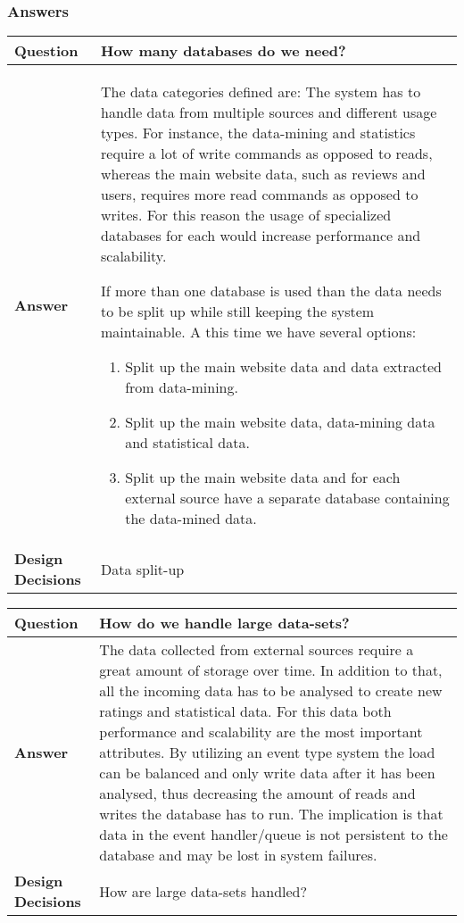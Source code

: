 \subsubsection{Answers}
\begin{longtable}{| l |  p{12cm} |}
\hline
\textbf{Question} & \textbf{How many databases do we need?} \\ \hline
\textbf{Answer} &
The data categories defined are:
The system has to handle data from multiple sources and different usage types. For instance, the data-mining and statistics require a lot of write commands as opposed to reads, whereas the main website data, such as reviews and users, requires more read commands as opposed to writes. For this reason the usage of specialized databases for each would increase performance and scalability.

If more than one database is used than the data needs to be split up while still keeping the system maintainable. 
A this time we have several options:
\begin{enumerate}
\item Split up the main website data and data extracted from data-mining.
\item Split up the main website data, data-mining data and statistical data.
\item Split up the main website data and for each external source have a separate database containing the data-mined data.
\end{enumerate}
 \\ \hline
\textbf{Design Decisions} & Data split-up \\ \hline
\end{longtable}

\begin{longtable}{| l |  p{12cm} |}
\hline
\textbf{Question} & \textbf{How do we handle large data-sets?} \\ \hline
\textbf{Answer} &
The data collected from external sources require a great amount of storage over time. In addition to that, all the incoming data has to be analysed to create new ratings and statistical data. For this data both performance and scalability are the most important attributes.
By utilizing an event type system the load can be balanced and only write data after it has been analysed, thus decreasing the amount of reads and writes the database has to run. The implication is that data in the event handler/queue is not persistent to the database and may be lost in system failures.
 \\ \hline
\textbf{Design Decisions} & How are large data-sets handled? \\ \hline
\end{longtable}


